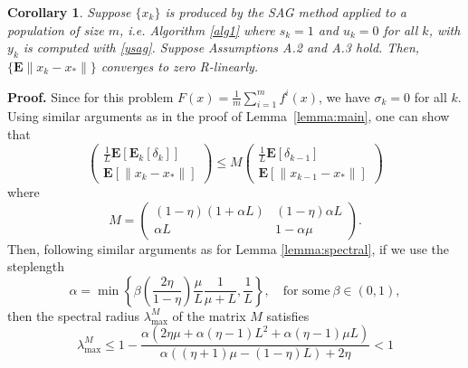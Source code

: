 \documentclass[11pt]{article}
\newtheorem{cor}[thm]{Corollary}
\newcommand{\E}{\mathbf{E}}
\begin{document}
\begin{cor}\label{thm:sag}
Suppose $\{x_k\}$ is produced by the SAG method applied to a population of size $m$, i.e. Algorithm \ref{alg1} where $s_k=1$ and $u_k=0$ for all $k$, with  $y_k$ is computed with \eqref{ysag}.
 Suppose Assumptions A.2 and A.3 hold.  Then, $\{\E\|x_k-x_\ast\|\}$  converges to zero R-linearly.
\end{cor}

\noindent 
\textbf{Proof.}  Since for this problem $F(x) =  \frac{1}{m} \sum_{i =1}^m f^i(x) $, we have $\sigma_k=0$ for all $k$. Using similar arguments as in the proof of Lemma~\ref{lemma:main}, one can show that
\begin{equation}\label{sagrecur}
 \begin{pmatrix} \frac{1}{L}\E[\E_k[\delta_k]]\\ \E[\|x_k-x_\ast \|]  \end{pmatrix} 
\leq M
 \begin{pmatrix} \frac{1}{L}\E[\delta_{k-1}] \\ \E[\| x_{k-1}-x_\ast \|]  \end{pmatrix} 
\end{equation}
where
\begin{equation}\label{M2}
 M = \begin{pmatrix} (1-\eta)(1+\alpha  L)  &   (1-\eta)\alpha L \\  
                   \alpha L  & 1-\alpha \mu 
                    \end{pmatrix}.                   
\end{equation}
Then, following similar arguments as for Lemma \ref{lemma:spectral}, if we use the  steplength
 \begin{equation}\label{alphasag}
 \alpha = \min\left\lbrace\beta\left(\frac{2 \eta}{1-\eta} \right)\frac{\mu}{L}\frac{1}{\mu+L},\frac{1}{L}\right\rbrace, \quad \mbox{for some} \ \beta  \in(0,1),
 \end{equation} 
then the spectral radius $\lambda^M_{\max}$ of the matrix $M$  satisfies
     \begin{equation}\label{sagspec}
  \lambda^M_{\max} \leq 1-\frac{\alpha  \left(2 \eta  \mu +\alpha  (\eta -1) L^2+\alpha  (\eta -1) \mu  L\right)}{\alpha  ((\eta +1) \mu -  (1-\eta ) L)+2 \eta }<1
   \end{equation}
	
\end{document}
